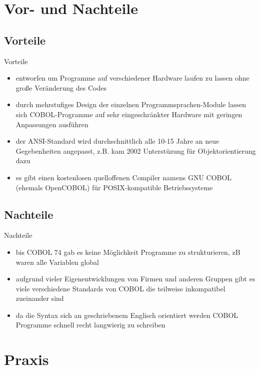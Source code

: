 \documentclass[handout]{beamer}
\begin{document}
\section{Vor- und Nachteile}

\subsection{Vorteile}

\begin{frame}{Vorteile}
	\begin{itemize}
		\item
			entworfen um Programme auf verschiedener Hardware laufen zu lassen ohne große Ver\"anderung des Codes
		\item
			durch mehrstufiges Design der einzelnen Programmsprachen-Module lassen sich COBOL-Programme auf sehr eingeschr\"ankter Hardware mit geringen Anpassungen ausf\"uhren
		\item
			der ANSI-Standard wird durchschnittlich alle 10-15 Jahre an neue Gegebenheiten angepasst, z.B. kam 2002 Unterstüzung für Objektorientierung dazu
		\item
			es gibt einen kostenlosen quelloffenen Compiler namens GNU COBOL (ehemals OpenCOBOL) für POSIX-kompatible Betriebssysteme
	\end{itemize}
\end{frame}

\subsection{Nachteile}

\begin{frame}{Nachteile}
	\begin{itemize}
		\item
		    bis COBOL 74 gab es keine M\"oglichkeit Programme zu strukturieren, zB waren alle Variablen global
		\item
			aufgrund vieler Eigenentwicklungen von Firmen und anderen Gruppen gibt es viele verschiedene Standards von COBOL die teilweise inkompatibel zueinander sind
		\item
			da die Syntax sich an geschriebenem Englisch orientiert werden COBOL Programme schnell recht langwierig zu schreiben
	\end{itemize}
\end{frame}

\section{Praxis}
\end{document}
